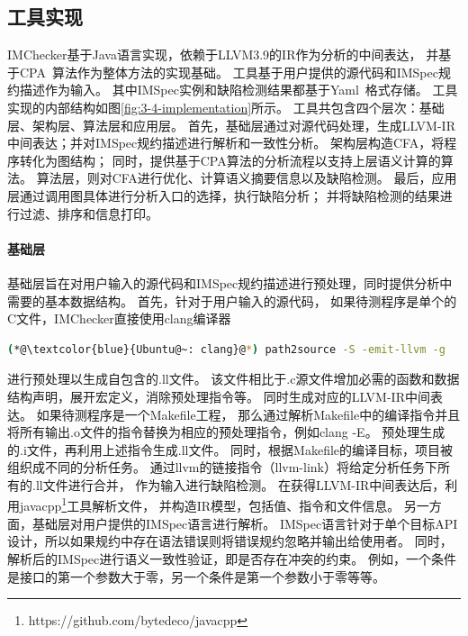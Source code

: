 \subsection{工具实现}
IMChecker基于Java语言实现，依赖于LLVM3.9的IR作为分析的中间表达，
并基于CPA~\cite{07-cav-cpachecker}算法作为整体方法的实现基础。
工具基于用户提供的源代码和IMSpec规约描述作为输入。
其中IMSpec实例和缺陷检测结果都基于Yaml~\cite{yaml}格式存储。
工具实现的内部结构如图\ref{fig:3-4-implementation}所示。
工具共包含四个层次：基础层、架构层、算法层和应用层。
首先，基础层通过对源代码处理，生成LLVM-IR中间表达；并对IMSpec规约描述进行解析和一致性分析。
架构层构造CFA，将程序转化为图结构；
同时，提供基于CPA算法的分析流程以支持上层语义计算的算法。
算法层，则对CFA进行优化、计算语义摘要信息以及缺陷检测。
最后，应用层通过调用图具体进行分析入口的选择，执行缺陷分析；
并将缺陷检测的结果进行过滤、排序和信息打印。

\paragraph{基础层}
基础层旨在对用户输入的源代码和IMSpec规约描述进行预处理，同时提供分析中需要的基本数据结构。
首先，针对于用户输入的源代码，
如果待测程序是单个的C文件，IMChecker直接使用clang编译器
\begin{lstlisting}[language={bash},
basicstyle=\linespread{0.8}\listingsfont,
numbers=none,
xleftmargin=.25\textwidth]
(*@\textcolor{blue}{Ubuntu@~: clang}@*) path2source -S -emit-llvm -g
\end{lstlisting}
进行预处理以生成自包含的.ll文件。
该文件相比于.c源文件增加必需的函数和数据结构声明，展开宏定义，消除预处理指令等。
同时生成对应的LLVM-IR中间表达。
如果待测程序是一个Makefile工程，
那么通过解析Makefile中的编译指令并且将所有输出.o文件的指令替换为相应的预处理指令，例如clang -E。
预处理生成的.i文件，再利用上述指令生成.ll文件。
同时，根据Makefile的编译目标，项目被组织成不同的分析任务。
通过llvm的链接指令（llvm-link）将给定分析任务下所有的.ll文件进行合并，
作为输入进行缺陷检测。
在获得LLVM-IR中间表达后，利用javacpp\footnote{https://github.com/bytedeco/javacpp}工具解析文件，
并构造IR模型，包括值、指令和文件信息。
另一方面，基础层对用户提供的IMSpec语言进行解析。
IMSpec语言针对于单个目标API设计，所以如果规约中存在语法错误则将错误规约忽略并输出给使用者。
同时，解析后的IMSpec进行语义一致性验证，即是否存在冲突的约束。
例如，一个条件是接口的第一个参数大于零，另一个条件是第一个参数小于零等等。

